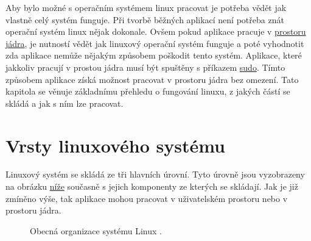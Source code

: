 Aby bylo možné s operačním systémem linux pracovat je potřeba vědět jak vlastně celý systém funguje. Při tvorbě běžných aplikací není potřeba
znát operační systém linux nějak dokonale. Ovšem pokud aplikace pracuje v \hyperref[sec:ProstorJadra]{prostoru jádra}, je nutností vědět jak linuxový operační
systém funguje a poté vyhodnotit zda aplikace nemůže nějakým způsobem poškodit tento systém. Aplikace, které jakkoliv pracují v prostou
jádra musí být spuštěny s příkazem \hyperref[sec:SuperUzivatel]{sudo}. Tímto způsobem aplikace získá možnost pracovat v prostoru jádra bez
omezení. Tato kapitola se věnuje základnímu přehledu o fungování linuxu, z jakých částí se skládá a jak s ním lze pracovat.

\section{Vrsty linuxového systému}

Linuxový systém se skládá ze tři hlavních úrovní. Tyto úrovně jsou vyzobrazeny na obrázku \hyperref[pic:StrukturaLinuxu]{níže} současně s jejich komponenty ze kterých se skládají.
Jak je již zmíněno výše, tak aplikace mohou pracovat v uživatelském prostoru nebo v prostoru jádra.

\begin{figure}[ht]
  \centering
  \caption{Obecná organizace systému Linux \cite{HowLinuxWorks}.}
  \label{pic:StrukturaLinuxu}
\end{figure}

